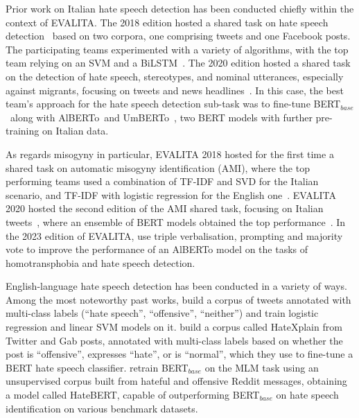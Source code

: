 \documentclass[11pt]{article}
\newcommand{\bert}{\mbox{BERT$_{base}$}}
\newcommand{\umbert}{\mbox{UmBERTo}}
\newcommand{\albert}{\mbox{AlBERTo}}
\begin{document}
Prior work on Italian hate speech detection has been conducted chiefly within the context of EVALITA\@. The 2018 edition hosted a shared task on hate speech detection~\cite{boscoOverviewEVALITA2018} based on two corpora, one comprising tweets and one Facebook posts. The participating teams experimented with a variety of algorithms, with the top team relying on an SVM and a BiLSTM~\cite{cimino2018multi}. The 2020 edition hosted a shared task on the detection of hate speech, stereotypes, and nominal utterances, especially against migrants, focusing on tweets and news headlines~\cite{basileEVALITA2020Overview}. In this case,
the best team's approach for the hate speech detection sub-task \cite{Lavergne2020TheNorthH} was to fine-tune \bert\, \cite{devlinBERTPretrainingDeep2019a} along with \albert\, \cite{PolignanoEtAlCLIC2019} and \umbert\, \cite{musixmatch-2020-umberto}, two BERT models with further pre-training on Italian data.

As regards misogyny in particular, EVALITA 2018 hosted for the first time a shared task on automatic misogyny identification (AMI), where the top performing teams used a combination of TF-IDF and SVD for the Italian scenario, and TF-IDF with logistic regression for the English one~\cite{Fersini2018OverviewOT}.
EVALITA 2020 hosted the second edition of the AMI shared task, focusing on Italian tweets~\cite{fersiniAMIEVALITA2020Automatic2020}, where an ensemble of BERT models obtained the top performance~\cite{mutiUniBOAMIMultiClass2020}. In the 2023 edition of EVALITA,  use triple verbalisation, prompting and majority vote to improve the performance of an AlBERTo model on the tasks of homotransphobia and hate speech detection.

English-language hate speech detection has been conducted in a variety of ways. Among the most noteworthy past works,  build a corpus of tweets annotated with multi-class labels (``hate speech'', ``offensive'', ``neither'') and train logistic regression and linear SVM models on it.
 build a corpus called HateXplain from Twitter and Gab posts, annotated with multi-class labels based on whether the post is ``offensive'', expresses ``hate'', or is ``normal'', which they use to fine-tune a BERT hate speech classifier.
 retrain BERT$_{base}$ on the MLM task using an unsupervised corpus built from hateful and offensive Reddit messages, obtaining a model called HateBERT, capable of outperforming BERT$_{base}$ on hate speech identification on various benchmark datasets.
\end{document}
